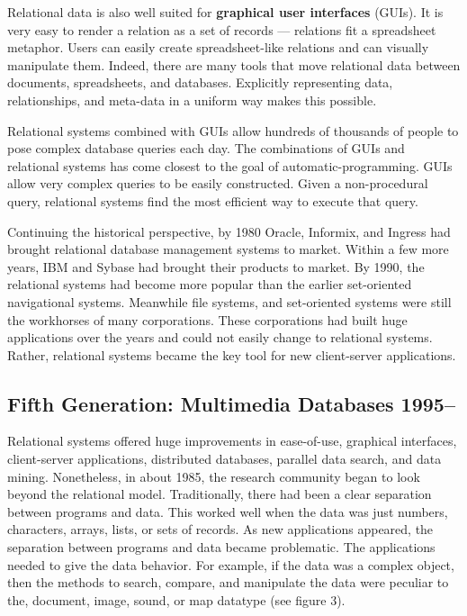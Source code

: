 \documentclass[a4paper,12pt,notitlepage,twoside,openright]{article}
\begin{document}
Relational data is also well suited for \textbf{graphical user
interfaces} (GUIs). It is very easy to render a relation as a set of
records --- relations fit a spreadsheet metaphor. Users can easily create
spreadsheet-like relations and can visually manipulate them. Indeed,
there are many tools that move relational data between documents,
spreadsheets, and databases. Explicitly representing data,
relationships, and meta-data in a uniform way makes this possible.

Relational systems combined with GUIs allow hundreds of thousands of
people to pose complex database queries each day. The combinations of
GUIs and relational systems has come closest to the goal of
automatic-programming. GUIs allow very complex queries to be easily
constructed. Given a non-procedural query, relational systems find the
most efficient way to execute that query.

Continuing the historical perspective, by 1980 Oracle, Informix, and
Ingress had brought relational database management systems to market.
Within a few more years, IBM and Sybase had brought their products to
market. By 1990, the relational systems had become more popular than the
earlier set-oriented navigational systems. Meanwhile file systems, and
set-oriented systems were still the workhorses of many corporations.
These corporations had built huge applications over the years and could
not easily change to relational systems. Rather, relational systems
became the key tool for new client-server applications.

\hypertarget{fifth-generation-multimedia-databases-1995--}{%
\subsection{Fifth Generation: Multimedia Databases 1995--}\label{fifth-generation-multimedia-databases-1995-}}

Relational systems offered huge improvements in ease-of-use, graphical
interfaces, client-server applications, distributed databases, parallel
data search, and data mining. Nonetheless, in about 1985, the research
community began to look beyond the relational model. Traditionally,
there had been a clear separation between programs and data. This worked
well when the data was just numbers, characters, arrays, lists, or sets
of records. As new applications appeared, the separation between
programs and data became problematic. The applications needed to give
the data behavior. For example, if the data was a complex object, then
the methods to search, compare, and manipulate the data were peculiar to
the, document, image, sound, or map datatype (see figure 3).
\end{document}
